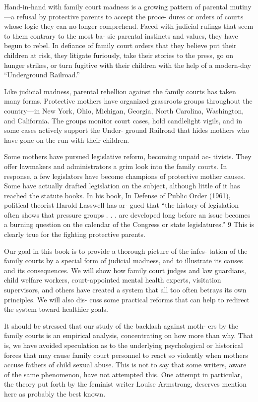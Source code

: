 Hand-in-hand with family court madness is a growing pattern of
parental mutiny—a refusal by protective parents to accept the proce-
dures or orders of courts whose logic they can no longer comprehend.
Faced with judicial rulings that seem to them contrary to the most ba-
sic parental instincts and values, they have begun to rebel. In defiance
of family court orders that they believe put their children at risk, they
litigate furiously, take their stories to the press, go on hunger strikes,
or turn fugitive with their children with the help of a modern-day
“Underground Railroad.” \pfl{}


Like judicial madness, parental rebellion against the family courts has
taken many forms. Protective mothers have organized grassroots groups
throughout the country—in New York, Ohio, Michigan, Georgia, North
Carolina, Washington, and California. The groups monitor court cases,
hold candlelight vigils, and in some cases actively support the Under-
ground Railroad that hides mothers who have gone on the run with their
children. \pfl{}


Some mothers have pursued legislative reform, becoming unpaid ac-
tivists. They offer lawmakers and administrators a grim look into the
family courts. In response, a few legislators have become champions of
protective mother causes. Some have actually drafted legislation on the
subject, although little of it has reached the statute books. In his book, In
Defense of Public Order (1961), political theorist Harold Lasswell has ar-
gued that “the history of legislation often shows that pressure groups . . .
are developed long before an issue becomes a burning question on the
calendar of the Congress or state legislatures.” 9 This is clearly true for
the fighting protective parents. \pfl{}


Our goal in this book is to provide a thorough picture of the infes-
tation of the family courts by a special form of judicial madness, and
to illustrate its causes and its consequences. We will show how family
court judges and law guardians, child welfare workers, court-appointed
mental health experts, visitation supervisors, and others have created
a system that all too often betrays its own principles. We will also dis-
cuss some practical reforms that can help to redirect the system toward
healthier goals. \pfl{}


It should be stressed that our study of the backlash against moth-
ers by the family courts is an empirical analysis, concentrating on how
more than why. That is, we have avoided speculation as to the underlying
psychological or historical forces that may cause family court personnel
to react so violently when mothers accuse fathers of child sexual abuse.
This is not to say that some writers, aware of the same phenomenon, have
not attempted this. One attempt in particular, the theory put forth by the
feminist writer Louise Armstrong, deserves mention here as probably
the best known. \pfl{}


